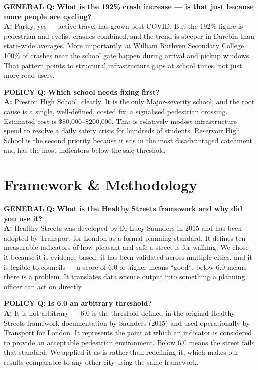 \documentclass[10pt,a4paper]{extarticle}
\newcommand{\qa}[4]{%
  \begin{mdframed}[
    backgroundcolor=PG,
    linecolor=MG,
    linewidth=1.2pt,
    leftline=true, rightline=false, topline=false, bottomline=false,
    innerleftmargin=10pt, innerrightmargin=8pt,
    innertopmargin=6pt, innerbottommargin=7pt,
    skipabove=5pt, skipbelow=2pt
  ]
  \noindent
  \colorbox{#2}{\tiny\color{white}\textbf{#1}}\hspace{4pt}%
  {\bfseries\color{DG} Q:} {\bfseries\color{INK}#3}\\[3pt]
  {\bfseries\color{MG} A:} {\color{SLT}#4}
  \end{mdframed}%
}
\begin{document}
\qa{GENERAL}{TEA}
{What is the 192\% crash increase --- is that just because more people are cycling?}
{Partly, yes --- active travel has grown post-COVID. But the 192\% figure is pedestrian and cyclist crashes combined, and the trend is steeper in Darebin than state-wide averages. More importantly, at William Ruthven Secondary College, 100\% of crashes near the school gate happen during arrival and pickup windows. That pattern points to structural infrastructure gaps at school times, not just more road users.}

\qa{POLICY}{AMB}
{Which school needs fixing first?}
{Preston High School, clearly. It is the only Major-severity school, and the root cause is a single, well-defined, costed fix: a signalised pedestrian crossing. Estimated cost is \$80,000--\$200,000. That is relatively modest infrastructure spend to resolve a daily safety crisis for hundreds of students. Reservoir High School is the second priority because it sits in the most disadvantaged catchment and has the most indicators below the safe threshold.}

\section{Framework \& Methodology}

\qa{GENERAL}{TEA}
{What is the Healthy Streets framework and why did you use it?}
{Healthy Streets was developed by Dr Lucy Saunders in 2015 and has been adopted by Transport for London as a formal planning standard. It defines ten measurable indicators of how pleasant and safe a street is for walking. We chose it because it is evidence-based, it has been validated across multiple cities, and it is legible to councils --- a score of 6.0 or higher means ``good'', below 6.0 means there is a problem. It translates data science output into something a planning officer can act on directly.}

\qa{POLICY}{AMB}
{Is 6.0 an arbitrary threshold?}
{It is not arbitrary --- 6.0 is the threshold defined in the original Healthy Streets framework documentation by Saunders (2015) and used operationally by Transport for London. It represents the point at which an indicator is considered to provide an acceptable pedestrian environment. Below 6.0 means the street fails that standard. We applied it as-is rather than redefining it, which makes our results comparable to any other city using the same framework.}
\end{document}
